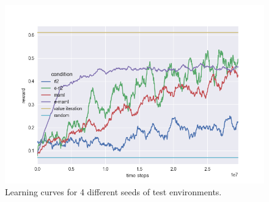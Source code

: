 \begin{figure}[H]
\begin{center}
\includegraphics[scale=0.335]{bradly_curves/64testgrid3.png}
\end{center}
\caption{Learning curves for 4 different seeds of test environments.}
\label{fig:appendix-learning-curves-0}
\end{figure} 

